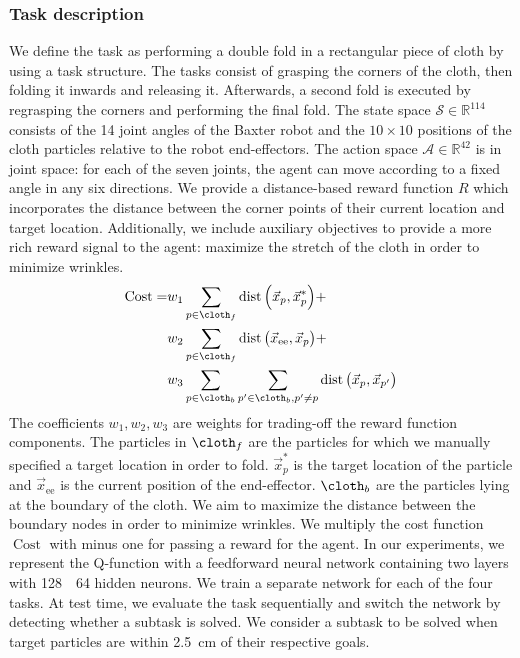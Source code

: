 \documentclass[\home/main.tex]{subfiles}
\begin{document}
\subsubsection{Task description}
We define the task as performing a double fold in a rectangular piece of cloth by using a task structure. The tasks consist of grasping the corners of the cloth, then folding it inwards and releasing it. Afterwards, a second fold is executed by regrasping the corners and performing the final fold.
The state space $\mathcal{S} \in \mathbb{R}^{114}$ consists of the 14 joint angles of the Baxter robot and the $10 \times 10$ positions of the cloth particles relative to the robot end-effectors.
The action space $\mathcal{A} \in \mathbb{R}^{42}$ is in joint space: for each of the seven joints, the agent can move according to a fixed angle in any six directions.
We provide a distance-based reward function $R$ which incorporates the distance between the corner points of their current location and target location. Additionally, we include auxiliary objectives to provide a more rich reward signal to the agent: maximize the stretch of the cloth in order to minimize wrinkles.
\begin{align} \label{eq:sim_cost_function}
    \operatorname{Cost} = & w_1 \sum_{p \in \cloth_f} \operatorname{dist}{\left( \vec{x}_p , \vec{x}_{p}^{*} \right)} + \nonumber                                            \\
                          & w_2 \sum_{p \in \cloth_f} \operatorname{dist}{\left( \vec{x}_{\text{ee}} , \vec{x}_{p} \right)} + \nonumber                                      \\
                          & w_3 \sum_{p \in \cloth_b} \sum_{p^{\prime} \in \cloth_b, p^{\prime} \neq p} \operatorname{dist}{\left( \vec{x}_p , \vec{x}_{p^{\prime}} \right)}
\end{align}
The coefficients $w_1,w_2, w_3$ are weights for trading-off the reward function components. The particles in $\cloth_f$ are the particles for which we manually specified a target location in order to fold. $\vec{x}_{p}^{*}$ is the target location of the particle and $\vec{x}_{\text{ee}}$ is the current position of the end-effector. $\cloth_b$ are the particles lying at the boundary of the cloth. We aim to maximize the distance between the boundary nodes in order to minimize wrinkles.
We multiply the cost function $\operatorname{Cost}$ with minus one for passing a reward for the agent.
In our experiments, we represent the Q-function with a feedforward neural network containing two layers with 128~\texttimes~64 hidden neurons. We train a separate network for each of the four tasks. At test time, we evaluate the task sequentially and switch the network by detecting whether a subtask is solved. We consider a subtask to be solved when target particles are within \qty{2.5}{\cm} of their respective goals.
\end{document}
